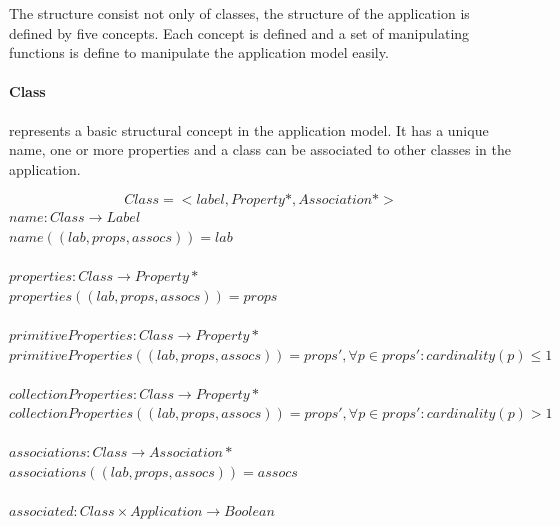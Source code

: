 \documentclass[11pt]{article}
\begin{document}
The structure consist not only of classes, the structure of the application is defined by five concepts. Each concept is defined and a set of manipulating functions is define to manipulate the application model easily.

\paragraph{Class} represents a basic structural concept in the application model. It has a unique name, one or more properties and a class can be associated to other classes in the application. 
	 
$$Class = < label, Property*, Association* >$$
$name : Class \rightarrow Label$ \\
$name((lab, props, assocs)) = lab$ \\ \\
$properties : Class \rightarrow Property*$ \\
$properties((lab, props, assocs)) = props $\\ \\
$primitiveProperties : Class \rightarrow Property*$ \\
$primitiveProperties((lab, props, assocs)) = props', \forall p \in props' : cardinality(p) \leq 1 $\\ \\
$collectionProperties : Class \rightarrow Property*$ \\
$collectionProperties((lab, props, assocs)) = props', \forall p \in props' : cardinality(p) > 1 $\\ \\
$associations : Class \rightarrow Association*$ \\
$associations((lab, props, assocs)) = assocs $ \\ \\
$associated :  Class \times Application \rightarrow Boolean $
\end{document}
